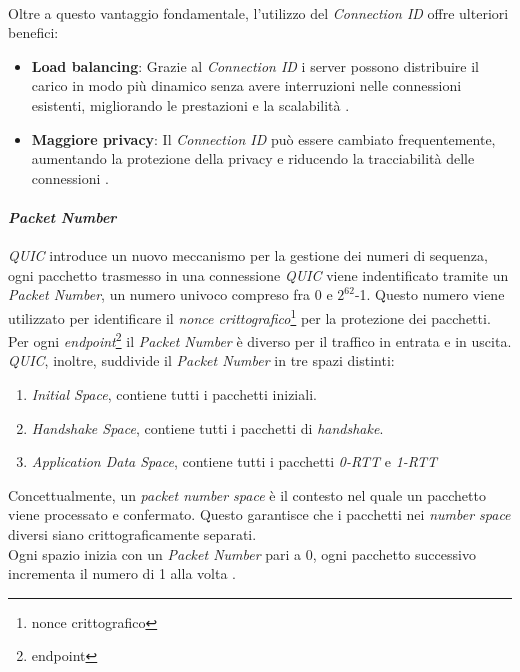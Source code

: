 \\
Oltre a questo vantaggio fondamentale, l'utilizzo del \emph{Connection ID} offre ulteriori benefici:
\begin{itemize}
\item \textbf{Load balancing}: Grazie al \emph{Connection ID} i server possono distribuire il carico in modo più dinamico senza avere interruzioni nelle connessioni esistenti, migliorando le prestazioni e la scalabilità \cite{quic}.
\item \textbf{Maggiore privacy}: Il \emph{Connection ID} può essere cambiato frequentemente, aumentando la protezione della privacy e riducendo la tracciabilità delle connessioni \cite{site:quic-security}.
\end{itemize}
\paragraph{\textit{Packet Number}}

\noindent \emph{QUIC} introduce un nuovo meccanismo per la gestione dei numeri di sequenza, ogni pacchetto trasmesso in una connessione \emph{QUIC} viene indentificato tramite un \emph{Packet Number}, un numero univoco 
compreso fra 0 e $2^{62}$-1. Questo numero viene utilizzato per identificare il \emph{nonce crittografico}\footnote{\gls{nonce crittografico}} per la protezione dei pacchetti. Per ogni \emph{endpoint}\footnote{\gls{endpoint}} il \emph{Packet Number} è diverso per il traffico in entrata e in uscita.
\emph{QUIC}, inoltre, suddivide il \emph{Packet Number} in tre spazi distinti:
\begin{enumerate}[label=\roman*]
    \item \emph{Initial Space}, contiene tutti i pacchetti iniziali.
    \item \emph{Handshake Space}, contiene tutti i pacchetti di \emph{handshake}.
    \item \emph{Application Data Space}, contiene tutti i pacchetti \emph{0-RTT} e \emph{1-RTT}
\end{enumerate}
\noindent Concettualmente, un \emph{packet number space} è il contesto nel quale un pacchetto viene processato e confermato. Questo garantisce che i pacchetti nei \emph{number space} diversi siano crittograficamente separati.
\\
Ogni spazio inizia con un \emph{Packet Number} pari a 0, ogni pacchetto successivo incrementa il numero di 1 alla volta \cite{site:rfc9000}. 


